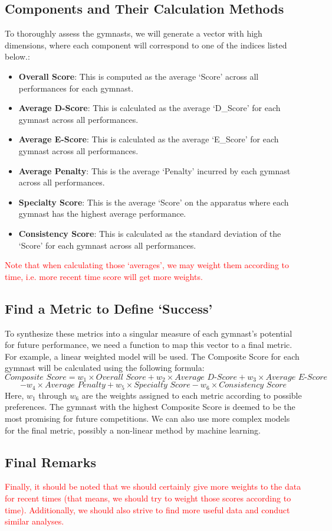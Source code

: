 \documentclass[11pt]{article}
\begin{document}
\subsection{Components and Their Calculation Methods}
To thoroughly assess the gymnasts, we will generate a vector with high dimensions, where each component will correspond to one of the indices listed below.:
    \begin{itemize}
        \item \textbf{Overall Score}: This is computed as the average `Score' across all performances for each gymnast.
        \item \textbf{Average D-Score}: This is calculated as the average `D\_Score' for each gymnast across all performances.
        \item \textbf{Average E-Score}: This is calculated as the average `E\_Score' for each gymnast across all performances.
        \item \textbf{Average Penalty}: This is the average `Penalty' incurred by each gymnast across all performances.
        \item \textbf{Specialty Score}: This is the average `Score' on the apparatus where each gymnast has the highest average performance.
        \item \textbf{Consistency Score}: This is calculated as the standard deviation of the `Score' for each gymnast across all performances.
    \end{itemize}
\textcolor{red}{Note that when calculating those `averages', we may weight them according to time, i.e. more recent time score will get more weights.}
\subsection{Find a Metric to Define `Success'}
    To synthesize these metrics into a singular measure of each gymnast's potential for future performance, we need a function to map this vector to a final metric. For example, a linear weighted model will be used. The Composite Score for each gymnast will be calculated using the following formula:
    \[
    \textit{Composite Score} = w_1 \times \textit{Overall Score} + w_2 \times \textit{Average D-Score} + w_3 \times \textit{Average E-Score}\]\[ - w_4 \times \textit{Average Penalty} + w_5 \times \textit{Specialty Score} - w_6 \times \textit{Consistency Score}
    \]
    Here, \( w_1 \) through \( w_6 \) are the weights assigned to each metric according to possible preferences. The gymnast with the highest Composite Score is deemed to be the most promising for future competitions. We can also use more complex models for the final metric, possibly a non-linear method by machine learning.
    \subsection{Final Remarks}
    \textcolor{red}{Finally, it should be noted that we should certainly give more weights to the data for recent times (that means, we should try to weight those scores according to time). Additionally, we should also strive to find more useful data and conduct similar analyses.}
\end{document}
